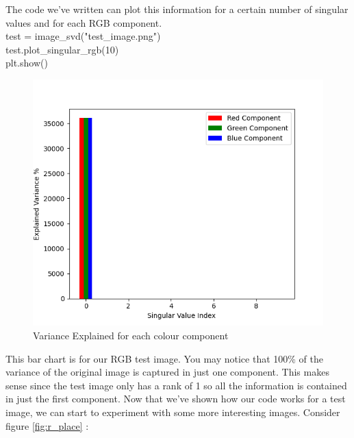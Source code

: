 \documentclass[a4paper,12pt]{article}
\newenvironment{code}{\ttfamily\\}{\\}
\newenvironment{scode}{\vspace{10pt} \begin{code}}{\vspace{10pt} \end{code}}
\begin{document}
	The code we've written can plot this information for a certain number of singular values and for each RGB component. 
	\begin{scode}
		test = image\_svd("test\_image.png") \\
		test.plot\_singular\_rgb(10) \\
		plt.show()
	\end{scode} \begin{figure}[h]
		\centering
		\includegraphics*[scale = 0.65]{variance_test_image.png}
		\caption{Variance Explained for each colour component}
	\end{figure}
	
	This bar chart is for our RGB test image. You may notice that 100\% of the variance of the original image is captured in just one component. This makes sense since the test image only has a rank of 1 so all the information is contained in just the first component. Now that we've shown how our code works for a test image, we can start to experiment with some more interesting images. Consider figure \ref{fig:r_place} \cite{r_place}:
	
\end{document}
